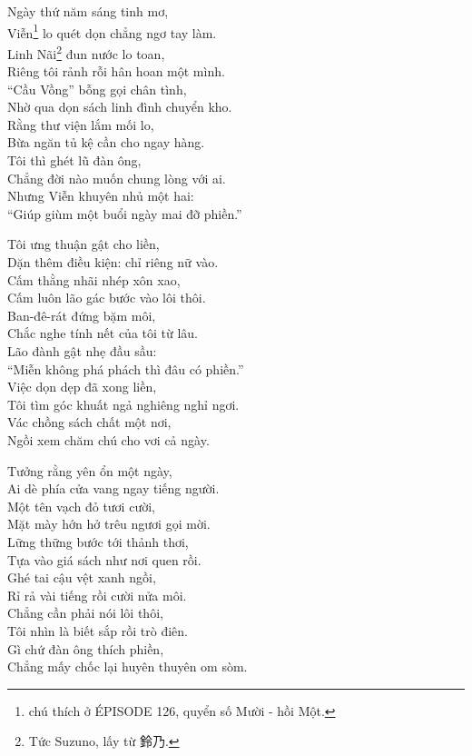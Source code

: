 \documentclass[../main.tex]{subfiles}
\begin{document}
\begin{center}
  Ngày thứ năm sáng tinh mơ,\\
  Viễn\footnote{chú thích ở {\flaregothic ÉPISODE 126}, quyển số Mười - hồi Một.} lo quét dọn chẳng ngơ tay làm.\\
  Linh Nãi\footnote{Tức Suzuno, lấy từ 鈴乃.} đun nước lo toan,\\
  Riêng tôi rảnh rỗi hân hoan một mình.\\
  ``Cầu Vồng'' bỗng gọi chân tình,\\
  Nhờ qua dọn sách linh đình chuyển kho.\\
  Rằng thư viện lắm mối lo,\\
  Bừa ngăn tủ kệ cần cho ngay hàng.\\
  Tôi thì ghét lũ đàn ông,\\
  Chẳng đời nào muốn chung lòng với ai.\\
  Nhưng Viễn khuyên nhủ một hai:\\
  ``Giúp giùm một buổi ngày mai đỡ phiền.''

  Tôi ưng thuận gật cho liền,\\
  Dặn thêm điều kiện: chỉ riêng nữ vào.\\
  Cấm thằng nhãi nhép xôn xao,\\
  Cấm luôn lão gác bước vào lôi thôi.\\
  Ban-đê-rát đứng bặm môi,\\
  Chắc nghe tính nết của tôi từ lâu.\\
  Lão đành gật nhẹ đầu sầu:\\
  ``Miễn không phá phách thì đâu có phiền.''\\
  Việc dọn dẹp đã xong liền,\\
  Tôi tìm góc khuất ngả nghiêng nghỉ ngơi.\\
  Vác chồng sách chất một nơi,\\
  Ngồi xem chăm chú cho vơi cả ngày.


  Tưởng rằng yên ổn một ngày,\\
  Ai dè phía cửa vang ngay tiếng người.\\
  Một tên vạch đỏ tươi cười,\\
  Mặt mày hớn hở trêu ngươi gọi mời.\\
  Lững thững bước tới thảnh thơi,\\
  Tựa vào giá sách như nơi quen rồi.\\
  Ghé tai cậu vệt xanh ngồi,\\
  Rỉ rả vài tiếng rồi cười nửa môi.\\
  Chẳng cần phải nói lôi thôi,\\
  Tôi nhìn là biết sắp rồi trò điên.\\
  Gì chứ đàn ông thích phiền,\\
  Chẳng mấy chốc lại huyên thuyên om sòm.


\end{center}
\end{document}
